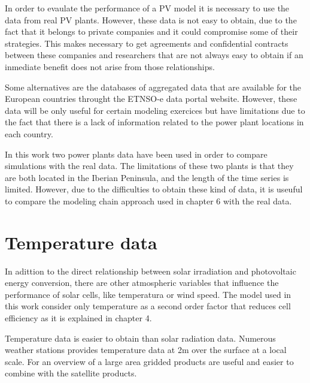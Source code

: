 In order to evaulate the performance of a PV model it is necessary to use the data from real PV plants. However, these data is not easy to obtain, due to the fact that it belongs to private companies and it could compromise some of their strategies. This makes necessary to get agreements and confidential contracts between these companies and researchers that are not always easy to obtain if an inmediate benefit does not arise from those relationships.

Some alternatives are the databases of aggregated data that are available for the European countries throught the ETNSO-e data portal website. However, these data will be only useful for certain modeling exercices but have limitations due to the fact that there is a lack of information related to the power plant locations in each country.

In this work two power plants data have been used in order to compare simulations with the real data. The limitations of these two plants is that they are both located in the Iberian Peninsula, and the length of the time series is limited. However, due to the difficulties to obtain these kind of data, it is useuful to compare the modeling chain approach used in chapter 6 with the real data.


\section{Temperature data}

  In adittion to the direct relationship between solar irradiation and photovoltaic energy conversion, there are other atmospheric variables that influence the performance of solar cells, like temperatura or wind speed. The model used in this work consider only temperature as a second order factor that reduces cell efficiency as it is explained in chapter 4.
 
  Temperature data is easier to obtain than solar radiation data. Numerous weather stations provides temperature data at 2m over the surface at a local scale. For an overview of a large area gridded products are useful and easier to combine with the satellite products.

